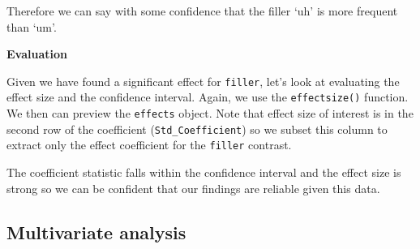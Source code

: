 \documentclass[
]{article}
\newenvironment{Shaded}{\begin{snugshade}}{\end{snugshade}}
\newcommand{\CommentTok}[1]{\textcolor[rgb]{0.56,0.35,0.01}{\textit{#1}}}
\newcommand{\DecValTok}[1]{\textcolor[rgb]{0.00,0.00,0.81}{#1}}
\newcommand{\FunctionTok}[1]{\textcolor[rgb]{0.00,0.00,0.00}{#1}}
\newcommand{\NormalTok}[1]{#1}
\newcommand{\OtherTok}[1]{\textcolor[rgb]{0.56,0.35,0.01}{#1}}
\newcommand{\SpecialCharTok}[1]{\textcolor[rgb]{0.00,0.00,0.00}{#1}}
\begin{document}
Therefore we can say with some confidence that the filler `uh' is more frequent than `um'.

\textbf{Evaluation}

Given we have found a significant effect for \texttt{filler}, let's look at evaluating the effect size and the confidence interval. Again, we use the \texttt{effectsize()} function. We then can preview the \texttt{effects} object. Note that effect size of interest is in the second row of the coefficient (\texttt{Std\_Coefficient}) so we subset this column to extract only the effect coefficient for the \texttt{filler} contrast.

\begin{Shaded}
\end{Shaded}

The coefficient statistic falls within the confidence interval and the effect size is strong so we can be confident that our findings are reliable given this data.

\hypertarget{multivariate-analysis}{%
\subsection{Multivariate analysis}\label{multivariate-analysis}}
\end{document}
